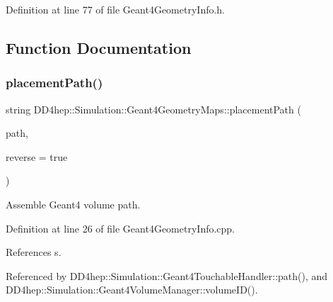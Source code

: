 Definition at line 77 of file Geant4\+Geometry\+Info.\+h.



\subsection{Function Documentation}
\hypertarget{namespace_d_d4hep_1_1_simulation_1_1_geant4_geometry_maps_af627f19c95eb3ca249c7464078af28dc}{}\label{namespace_d_d4hep_1_1_simulation_1_1_geant4_geometry_maps_af627f19c95eb3ca249c7464078af28dc} 
\subsubsection{\texorpdfstring{placement\+Path()}{placementPath()}}
{\footnotesize\ttfamily string D\+D4hep\+::\+Simulation\+::\+Geant4\+Geometry\+Maps\+::placement\+Path (\begin{DoxyParamCaption}\item[{const \hyperlink{namespace_d_d4hep_1_1_simulation_1_1_geant4_geometry_maps_a8a325934adb143cb1cbc47dd030395ed}{Geant4\+Placement\+Path} \&}]{path,  }\item[{bool}]{reverse = {\ttfamily true} }\end{DoxyParamCaption})}



Assemble Geant4 volume path. 



Definition at line 26 of file Geant4\+Geometry\+Info.\+cpp.



References s.



Referenced by D\+D4hep\+::\+Simulation\+::\+Geant4\+Touchable\+Handler\+::path(), and D\+D4hep\+::\+Simulation\+::\+Geant4\+Volume\+Manager\+::volume\+I\+D().


